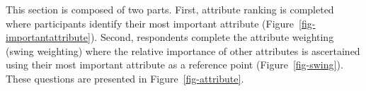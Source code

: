 \documentclass[
  number,
  preprint]{elsarticle}
\begin{document}
This section is composed of two parts. First, attribute ranking is
completed where participants identify their most important attribute
(Figure~\ref{fig-importantattribute}). Second, respondents complete the
attribute weighting (swing weighting) where the relative importance of
other attributes is ascertained using their most important attribute as
a reference point (Figure~\ref{fig-swing}). These questions are
presented in Figure~\ref{fig-attribute}.

\begin{figure}

\begin{minipage}{0.50\linewidth}



\end{minipage}%
%
\begin{minipage}{0.50\linewidth}

\end{minipage}
\end{figure}
\end{document}
